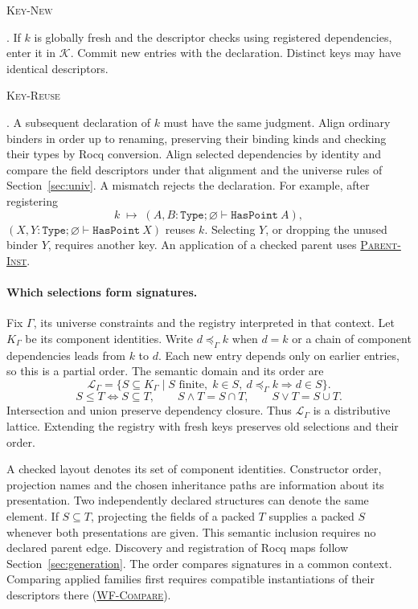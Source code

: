 \documentclass{article}
\newcommand{\ttt}[1]{\texttt{#1}}
\newcommand{\rdefn}[1]{\hypertarget{rule-#1}{\textsc{#1}}}
\newcommand{\ruse}[1]{\hyperlink{rule-#1}{\textsc{#1}}}
\begin{document}
\rdefn{Key-New}. If $k$ is globally fresh and the descriptor checks
using registered dependencies, enter it in $\mathcal K$. Commit new
entries with the declaration. Distinct keys may have identical descriptors.

\rdefn{Key-Reuse}. A subsequent declaration of $k$ must have the same
judgment. Align ordinary binders in order up to renaming, preserving their
binding kinds and checking their types by Rocq conversion. Align selected
dependencies by identity and compare the field descriptors under that
alignment and the universe rules of Section~\ref{sec:univ}. A mismatch
rejects the declaration. For example, after registering
\[
 k\;\mapsto\;(A,B:\ttt{Type};\varnothing\vdash\ttt{HasPoint}\ A),
\]
$(X,Y:\ttt{Type};\varnothing\vdash\ttt{HasPoint}\ X)$ reuses $k$.
Selecting $Y$, or dropping the unused binder $Y$, requires another key.
An application of a checked parent uses \ruse{Parent-Inst}.

\paragraph{Which selections form signatures.}
Fix $\Gamma$, its universe constraints and the registry interpreted
in that context. Let $K_\Gamma$ be its component identities. Write $d\preceq_\Gamma k$ when $d=k$ or a chain
of component dependencies leads from $k$ to $d$. Each new entry depends
only on earlier entries, so this is a partial order. The semantic domain
and its order are
\[
 \mathcal L_\Gamma
   =\{S\subseteq K_\Gamma\mid S\text{ finite},\;
       k\in S,\ d\preceq_\Gamma k\Rightarrow d\in S\}.
\]
\[
 S\le T \iff S\subseteq T,\qquad
 S\wedge T=S\cap T,\qquad S\vee T=S\cup T.
\]
Intersection and union preserve dependency closure. Thus
$\mathcal L_\Gamma$ is a distributive lattice. Extending the registry
with fresh keys preserves old selections and their order.

A checked layout denotes its set of component identities. Constructor
order, projection names and the chosen inheritance paths are information
about its presentation. Two independently declared structures can denote
the same element. If $S\subseteq T$, projecting the fields of a packed
$T$ supplies a packed $S$ whenever both presentations are given. This
semantic inclusion requires no declared parent edge. Discovery and
registration of Rocq maps follow Section~\ref{sec:generation}.
The order compares signatures in a common context. Comparing applied
families first requires compatible instantiations of their descriptors
there (\ruse{WF-Compare}).
\end{document}
